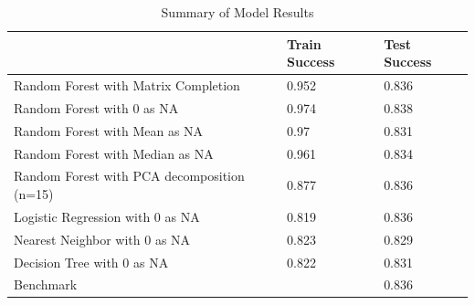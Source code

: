 \documentclass[a4paper]{article}
\begin{document}
\begin{table}[h]
\caption{Summary of Model Results}
\label{my-label}
\begin{tabular}{lll}
\hline
                                            & Train Success & Test Success \\ \hline
Random Forest with Matrix Completion        & 0.952         & 0.836        \\ \hline
Random Forest with 0 as NA                  & 0.974         & 0.838        \\ \hline
Random Forest with Mean as NA               & 0.97          & 0.831        \\ \hline
Random Forest with Median as NA             & 0.961         & 0.834        \\ \hline
Random Forest with PCA decomposition (n=15) & 0.877         & 0.836        \\ \hline
Logistic Regression with 0 as NA            & 0.819         & 0.836        \\ \hline
Nearest Neighbor with 0 as NA               & 0.823         & 0.829        \\ \hline
Decision Tree with 0 as NA                  & 0.822         & 0.831        \\ \hline
Benchmark                                   &               & 0.836       
\end{tabular}
\end{table}
\end{document}
